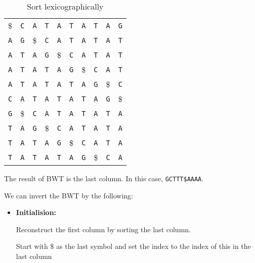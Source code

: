 \documentclass[10pt,\jkfside,a4paper]{article}
\begin{document}
\begin{enumerate}
\begin{table}[H]
        \centering

        \begin{tabular}{cccccccccc}
            \$ & \texttt C & \texttt A & \texttt T & \texttt A & \texttt T & \texttt A & \texttt T & \texttt A & \texttt G \\
            \texttt A & \texttt G & \$ & \texttt C & \texttt A & \texttt T & \texttt A & \texttt T & \texttt A & \texttt T \\
            \texttt A & \texttt T & \texttt A & \texttt G & \$ & \texttt C & \texttt A & \texttt T & \texttt A & \texttt T \\
            \texttt A & \texttt T & \texttt A & \texttt T & \texttt A & \texttt G & \$ & \texttt C & \texttt A & \texttt T \\
            \texttt A & \texttt T & \texttt A & \texttt T & \texttt A & \texttt T & \texttt A & \texttt G & \$ & \texttt C \\
            \texttt C & \texttt A & \texttt T & \texttt A & \texttt T & \texttt A & \texttt T & \texttt A & \texttt G & \$ \\
            \texttt G & \$ & \texttt C & \texttt A & \texttt T & \texttt A & \texttt T & \texttt A & \texttt T & \texttt A \\
            \texttt T & \texttt A & \texttt G & \$ & \texttt C & \texttt A & \texttt T & \texttt A & \texttt T & \texttt A \\
            \texttt T & \texttt A & \texttt T & \texttt A & \texttt G & \$ & \texttt C & \texttt A & \texttt T & \texttt A \\
            \texttt T & \texttt A & \texttt T & \texttt A & \texttt T & \texttt A & \texttt G & \$ & \texttt C & \texttt A
        \end{tabular}

        \caption{Sort lexicographically}

    \end{table}

    The result of BWT is the last column. In this case, \texttt{GCTTT\$AAAA}.

    We can invert the BWT by the following:
    \begin{itemize}

        \item \textbf{Initialision:}

        Reconstruct the first column by sorting the last column.

        Start with $\$$ as the last symbol and set the index to the index of this in the last column


\end{itemize}
\end{enumerate}
\end{document}
